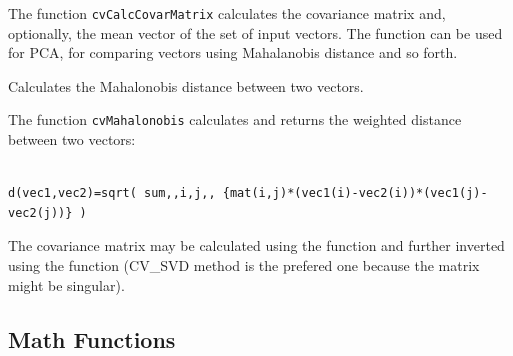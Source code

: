 \begin{description}
{\begin{description}

\end{description}}
\end{description}

The function \texttt{cvCalcCovarMatrix} calculates the covariance matrix
and, optionally, the mean vector of the set of input vectors. The function
can be used for PCA, for comparing vectors using Mahalanobis distance and so forth.

\label{Mahalonobis}

Calculates the Mahalonobis distance between two vectors.


\begin{description}
\end{description}


The function \texttt{cvMahalonobis} calculates and returns the weighted distance between two vectors:

\begin{lstlisting}

d(vec1,vec2)=sqrt( sum,,i,j,, {mat(i,j)*(vec1(i)-vec2(i))*(vec1(j)-vec2(j))} )

\end{lstlisting}

The covariance matrix may be calculated using the  function and further inverted using the  function (CV\_SVD method is the prefered one because the matrix might be singular).


\subsection{Math Functions}


